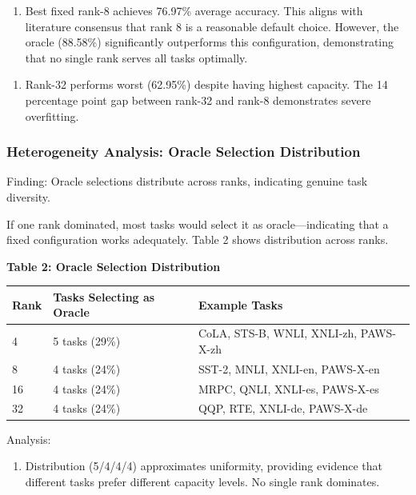 \begin{enumerate}
\item Best fixed rank-8 achieves 76.97\% average accuracy. This aligns with literature consensus that rank 8 is a reasonable default choice. However, the oracle (88.58\%) significantly outperforms this configuration, demonstrating that no single rank serves all tasks optimally.
\end{enumerate}

\begin{enumerate}
\item Rank-32 performs worst (62.95\%) despite having highest capacity. The 14 percentage point gap between rank-32 and rank-8 demonstrates severe overfitting.
\end{enumerate}

\subsubsection{Heterogeneity Analysis: Oracle Selection Distribution}

Finding: Oracle selections distribute across ranks, indicating genuine task diversity.

If one rank dominated, most tasks would select it as oracle—indicating that a fixed configuration works adequately. Table 2 shows distribution across ranks.

\textbf{Table 2: Oracle Selection Distribution}

\begin{table}[htbp]
\centering
\begin{tabular}{lll}
\toprule
Rank & Tasks Selecting as Oracle & Example Tasks \\
\midrule
4 & 5 tasks (29\%) & CoLA, STS-B, WNLI, XNLI-zh, PAWS-X-zh \\
8 & 4 tasks (24\%) & SST-2, MNLI, XNLI-en, PAWS-X-en \\
16 & 4 tasks (24\%) & MRPC, QNLI, XNLI-es, PAWS-X-es \\
32 & 4 tasks (24\%) & QQP, RTE, XNLI-de, PAWS-X-de \\
\bottomrule
\end{tabular}
\end{table}

Analysis:

\begin{enumerate}
\item Distribution (5/4/4/4) approximates uniformity, providing evidence that different tasks prefer different capacity levels. No single rank dominates.
\end{enumerate}

